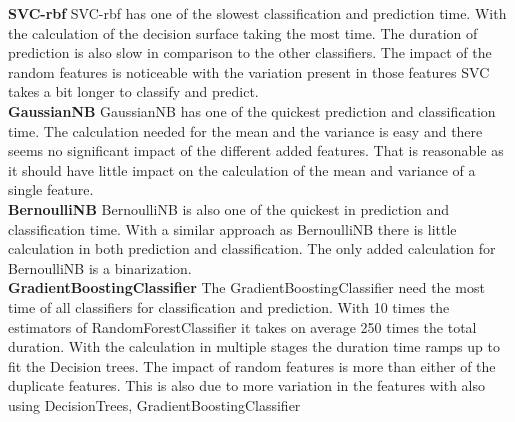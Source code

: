 \documentclass[a4paper,10pt]{article}
\begin{document}
\textbf{SVC-rbf} SVC-rbf has one of the slowest classification and prediction time. With the calculation of the decision surface taking the most time. The duration of prediction is also slow in comparison to the other classifiers. The impact of the random features is noticeable with the variation present in those features SVC takes a bit longer to  classify and predict. \\

\textbf{GaussianNB} GaussianNB has one of the quickest prediction and classification time. The calculation needed for the mean and the variance is easy and there seems no significant impact of the different added features. That is reasonable as it should have little impact on the calculation of the mean and variance of a single feature.\\

\textbf{BernoulliNB} BernoulliNB is also one of the quickest in prediction and classification time. With a similar approach as BernoulliNB there is little calculation in both prediction and classification. The only added calculation for BernoulliNB is a binarization. \\

\textbf{GradientBoostingClassifier} The GradientBoostingClassifier need the most time of all classifiers for classification and prediction. With 10 times the estimators of RandomForestClassifier it takes on average 250 times the total duration. With the calculation in multiple stages the duration time ramps up to fit the Decision trees. The impact of random features is more than either of the duplicate features. This is also due to more variation in the features with also using DecisionTrees, GradientBoostingClassifier 
  \\

\end{document}
